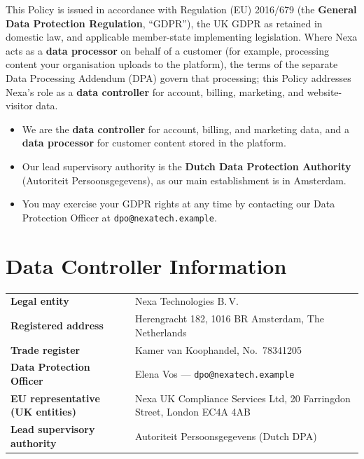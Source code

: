 \documentclass[11pt,a4paper]{scrartcl}
\begin{document}
This Policy is issued in accordance with Regulation (EU) 2016/679 (the \textbf{General Data
Protection Regulation}, ``GDPR''), the UK GDPR as retained in domestic law, and applicable
member-state implementing legislation. Where Nexa acts as a \textbf{data processor} on behalf of
a customer (for example, processing content your organisation uploads to the platform), the
terms of the separate Data Processing Addendum (DPA) govern that processing; this Policy
addresses Nexa's role as a \textbf{data controller} for account, billing, marketing, and
website-visitor data.

\begin{keybox}[At a glance]
\begin{itemize}
  \item We are the \textbf{data controller} for account, billing, and marketing data, and a
        \textbf{data processor} for customer content stored in the platform.
  \item Our lead supervisory authority is the \textbf{Dutch Data Protection Authority}
        (Autoriteit Persoonsgegevens), as our main establishment is in Amsterdam.
  \item You may exercise your GDPR rights at any time by contacting our Data Protection
        Officer at \texttt{dpo@nexatech.example}.
\end{itemize}
\end{keybox}

\section{Data Controller Information}

\begin{tabularx}{\linewidth}{@{}l Y@{}}
\toprule
\textbf{Legal entity} & Nexa Technologies B.\,V. \\
\textbf{Registered address} & Herengracht 182, 1016 BR Amsterdam, The Netherlands \\
\textbf{Trade register} & Kamer van Koophandel, No.\ 78341205 \\
\textbf{Data Protection Officer} & Elena Vos --- \texttt{dpo@nexatech.example} \\
\textbf{EU representative (UK entities)} & Nexa UK Compliance Services Ltd, 20 Farringdon
  Street, London EC4A 4AB \\
\textbf{Lead supervisory authority} & Autoriteit Persoonsgegevens (Dutch DPA) \\
\bottomrule
\end{tabularx}
\end{document}
